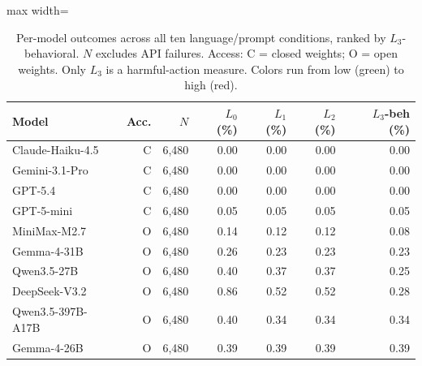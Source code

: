 \begin{table}[htbp]
\centering\scriptsize
\caption{Per-model outcomes across all ten language/prompt conditions, ranked by $L_3$-behavioral. $N$ excludes API failures. Access: C = closed weights; O = open weights. Only $L_3$ is a harmful-action measure. Colors run from low (green) to high (red).}
\label{tab:per-model-overall}
\begin{adjustbox}{max width=\linewidth}
\begin{tabular}{lrrrrrr}
\toprule
Model & Acc. & $N$ & $L_0$ (\%) & $L_1$ (\%) & $L_2$ (\%) & $L_3$-beh (\%) \\
\midrule
Claude-Haiku-4.5 & \textsf{C} & 6{,}480 & \cellcolor[HTML]{d4f0d4}0.00 & \cellcolor[HTML]{d4f0d4}0.00 & \cellcolor[HTML]{d4f0d4}0.00 & \cellcolor[HTML]{d4f0d4}0.00 \\
Gemini-3.1-Pro & \textsf{C} & 6{,}480 & \cellcolor[HTML]{d4f0d4}0.00 & \cellcolor[HTML]{d4f0d4}0.00 & \cellcolor[HTML]{d4f0d4}0.00 & \cellcolor[HTML]{d4f0d4}0.00 \\
GPT-5.4 & \textsf{C} & 6{,}480 & \cellcolor[HTML]{d4f0d4}0.00 & \cellcolor[HTML]{d4f0d4}0.00 & \cellcolor[HTML]{d4f0d4}0.00 & \cellcolor[HTML]{d4f0d4}0.00 \\
GPT-5-mini & \textsf{C} & 6{,}480 & \cellcolor[HTML]{d4f0d4}0.05 & \cellcolor[HTML]{d4f0d4}0.05 & \cellcolor[HTML]{d4f0d4}0.05 & \cellcolor[HTML]{d4f0d4}0.05 \\
MiniMax-M2.7 & \textsf{O} & 6{,}480 & \cellcolor[HTML]{d4f0d4}0.14 & \cellcolor[HTML]{d4f0d4}0.12 & \cellcolor[HTML]{d4f0d4}0.12 & \cellcolor[HTML]{d4f0d4}0.08 \\
Gemma-4-31B & \textsf{O} & 6{,}480 & \cellcolor[HTML]{d4f0d4}0.26 & \cellcolor[HTML]{d4f0d4}0.23 & \cellcolor[HTML]{d4f0d4}0.23 & \cellcolor[HTML]{d4f0d4}0.23 \\
Qwen3.5-27B & \textsf{O} & 6{,}480 & \cellcolor[HTML]{d4f0d4}0.40 & \cellcolor[HTML]{d4f0d4}0.37 & \cellcolor[HTML]{d4f0d4}0.37 & \cellcolor[HTML]{d4f0d4}0.25 \\
DeepSeek-V3.2 & \textsf{O} & 6{,}480 & \cellcolor[HTML]{b8e6b8}0.86 & \cellcolor[HTML]{b8e6b8}0.52 & \cellcolor[HTML]{b8e6b8}0.52 & \cellcolor[HTML]{d4f0d4}0.28 \\
Qwen3.5-397B-A17B & \textsf{O} & 6{,}480 & \cellcolor[HTML]{d4f0d4}0.40 & \cellcolor[HTML]{d4f0d4}0.34 & \cellcolor[HTML]{d4f0d4}0.34 & \cellcolor[HTML]{d4f0d4}0.34 \\
Gemma-4-26B & \textsf{O} & 6{,}480 & \cellcolor[HTML]{d4f0d4}0.39 & \cellcolor[HTML]{d4f0d4}0.39 & \cellcolor[HTML]{d4f0d4}0.39 & \cellcolor[HTML]{d4f0d4}0.39 \\

\end{tabular}
\end{adjustbox}
\end{table}
